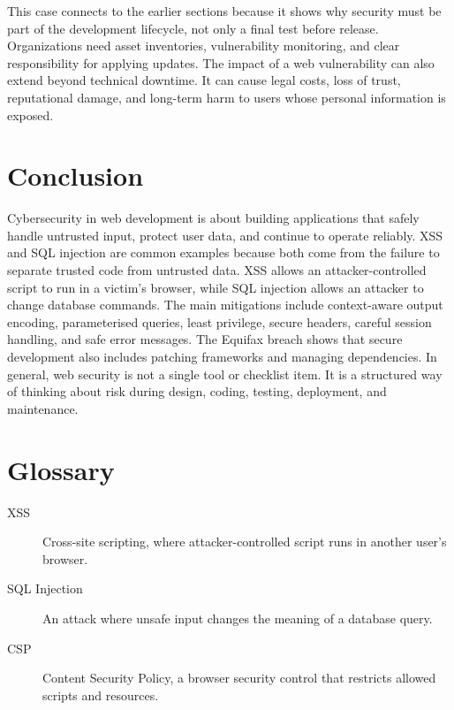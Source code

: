 \documentclass[12pt,a4paper]{article}
\begin{document}
This case connects to the earlier sections because it shows why security must be part of the development lifecycle, not only a final test before release. Organizations need asset inventories, vulnerability monitoring, and clear responsibility for applying updates. The impact of a web vulnerability can also extend beyond technical downtime. It can cause legal costs, loss of trust, reputational damage, and long-term harm to users whose personal information is exposed.

\section{Conclusion}
\label{sec:conclusion}

Cybersecurity in web development is about building applications that safely handle untrusted input, protect user data, and continue to operate reliably. XSS and SQL injection are common examples because both come from the failure to separate trusted code from untrusted data. XSS allows an attacker-controlled script to run in a victim's browser, while SQL injection allows an attacker to change database commands. The main mitigations include context-aware output encoding, parameterised queries, least privilege, secure headers, careful session handling, and safe error messages. The Equifax breach shows that secure development also includes patching frameworks and managing dependencies. In general, web security is not a single tool or checklist item. It is a structured way of thinking about risk during design, coding, testing, deployment, and maintenance.

\section*{Glossary}
\begin{description}
    \item[XSS] Cross-site scripting, where attacker-controlled script runs in another user's browser.
    \item[SQL Injection] An attack where unsafe input changes the meaning of a database query.
    \item[CSP] Content Security Policy, a browser security control that restricts allowed scripts and resources.
\end{description}

\newpage
\printbibliography
\end{document}
